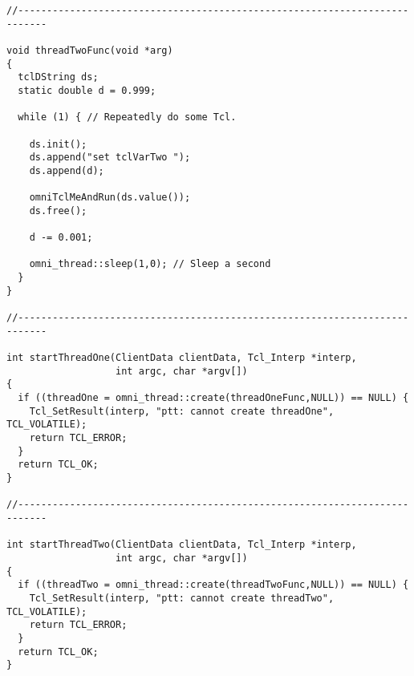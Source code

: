 \documentclass[11pt]{article}
\begin{document}
\begin{verbatim}
//---------------------------------------------------------------------------

void threadTwoFunc(void *arg)
{
  tclDString ds;
  static double d = 0.999;
  
  while (1) { // Repeatedly do some Tcl.

    ds.init();
    ds.append("set tclVarTwo ");
    ds.append(d);
    
    omniTclMeAndRun(ds.value());
    ds.free();

    d -= 0.001;
    
    omni_thread::sleep(1,0); // Sleep a second
  }
}

//---------------------------------------------------------------------------

int startThreadOne(ClientData clientData, Tcl_Interp *interp,
                   int argc, char *argv[])
{
  if ((threadOne = omni_thread::create(threadOneFunc,NULL)) == NULL) {
    Tcl_SetResult(interp, "ptt: cannot create threadOne", TCL_VOLATILE);
    return TCL_ERROR;
  }
  return TCL_OK;
}

//---------------------------------------------------------------------------

int startThreadTwo(ClientData clientData, Tcl_Interp *interp,
                   int argc, char *argv[])
{
  if ((threadTwo = omni_thread::create(threadTwoFunc,NULL)) == NULL) {
    Tcl_SetResult(interp, "ptt: cannot create threadTwo", TCL_VOLATILE);
    return TCL_ERROR;
  }
  return TCL_OK;
}
\end{verbatim}
\newpage
\end{document}
